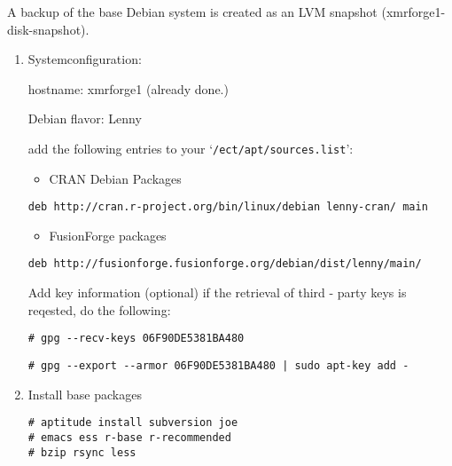 \documentclass[a4paper]{article}
\let\code=\texttt
\newcommand{\class}[1]{`\code{#1}'}
\let\file=\class
\begin{document}
A backup of the base Debian system is created as an 
LVM snapshot (xmrforge1-disk-snapshot).

\begin{enumerate}
\item Systemconfiguration:
	
hostname: xmrforge1 (already done.)
\par Debian flavor: Lenny	

add the following entries to your \file{/ect/apt/sources.list}:	
\begin{itemize}
\item CRAN Debian Packages 
\end{itemize}
\begin{lstlisting}[frame=single, framerule=0.95pt]
deb http://cran.r-project.org/bin/linux/debian lenny-cran/ main
\end{lstlisting}
\begin{itemize}
\item FusionForge packages
\end{itemize}
\medskip
{}
\begin{lstlisting}[frame=single, framerule=0.95pt]
deb http://fusionforge.fusionforge.org/debian/dist/lenny/main/
\end{lstlisting}

Add key information (optional) if the retrieval of third - party keys
is reqested, do the following:

\medskip
{}
\begin{lstlisting}[frame=single, framerule=0.95pt]
# gpg --recv-keys 06F90DE5381BA480
\end{lstlisting}
\medskip

\begin{lstlisting}[frame=single, framerule=0.95pt]
# gpg --export --armor 06F90DE5381BA480 | sudo apt-key add -
\end{lstlisting}


	\item Install base packages

\begin{lstlisting}[frame=single, framerule=0.95pt]
# aptitude install subversion joe
# emacs ess r-base r-recommended 
# bzip rsync less
\end{lstlisting}


\end{enumerate}
\end{document}
